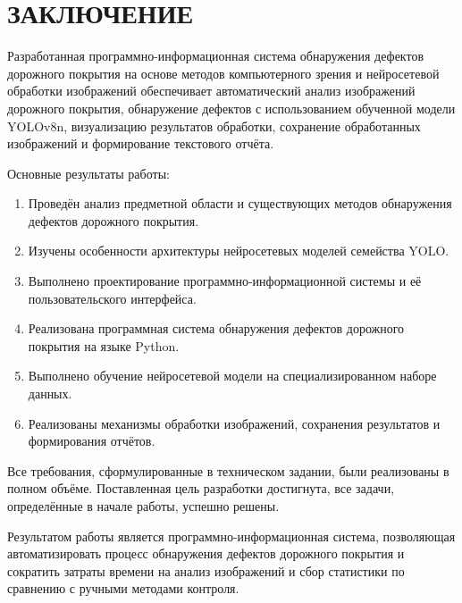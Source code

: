 \section*{ЗАКЛЮЧЕНИЕ}

Разработанная программно-информационная система обнаружения дефектов дорожного покрытия на основе методов компьютерного зрения и нейросетевой обработки изображений обеспечивает автоматический анализ изображений дорожного покрытия, обнаружение дефектов с использованием обученной модели YOLOv8n, визуализацию результатов обработки, сохранение обработанных изображений и формирование текстового отчёта.

Основные результаты работы:

\begin{enumerate}
	\item Проведён анализ предметной области и существующих методов обнаружения дефектов дорожного покрытия.
	\item Изучены особенности архитектуры нейросетевых моделей семейства YOLO.
	\item Выполнено проектирование программно-информационной системы и её пользовательского интерфейса.
	\item Реализована программная система обнаружения дефектов дорожного покрытия на языке Python.
	\item Выполнено обучение нейросетевой модели на специализированном наборе данных.
	\item Реализованы механизмы обработки изображений, сохранения результатов и формирования отчётов.
\end{enumerate}

Все требования, сформулированные в техническом задании, были реализованы в полном объёме. Поставленная цель разработки достигнута, все задачи, определённые в начале работы, успешно решены.

Результатом работы является программно-информационная система, позволяющая автоматизировать процесс обнаружения дефектов дорожного покрытия и сократить затраты времени на анализ изображений и сбор статистики по сравнению с ручными методами контроля.